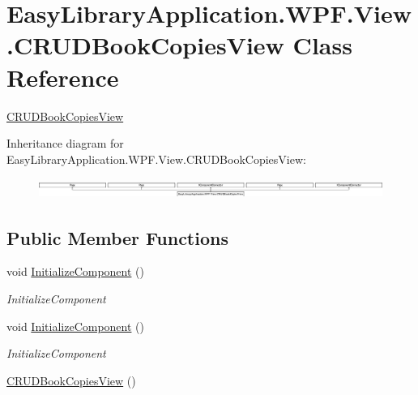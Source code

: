 \hypertarget{class_easy_library_application_1_1_w_p_f_1_1_view_1_1_c_r_u_d_book_copies_view}{}\section{Easy\+Library\+Application.\+W\+P\+F.\+View.\+C\+R\+U\+D\+Book\+Copies\+View Class Reference}
\label{class_easy_library_application_1_1_w_p_f_1_1_view_1_1_c_r_u_d_book_copies_view}


\mbox{\hyperlink{class_easy_library_application_1_1_w_p_f_1_1_view_1_1_c_r_u_d_book_copies_view}{C\+R\+U\+D\+Book\+Copies\+View}}  


Inheritance diagram for Easy\+Library\+Application.\+W\+P\+F.\+View.\+C\+R\+U\+D\+Book\+Copies\+View\+:\begin{figure}[H]
\begin{center}
\leavevmode
\includegraphics[height=0.643678cm]{class_easy_library_application_1_1_w_p_f_1_1_view_1_1_c_r_u_d_book_copies_view}
\end{center}
\end{figure}
\subsection*{Public Member Functions}
\begin{DoxyCompactItemize}
\item 
void \mbox{\hyperlink{class_easy_library_application_1_1_w_p_f_1_1_view_1_1_c_r_u_d_book_copies_view_aba4ee0c105f80387d4930984c400b7b0}{Initialize\+Component}} ()
\begin{DoxyCompactList}\small\item\em Initialize\+Component \end{DoxyCompactList}\item 
void \mbox{\hyperlink{class_easy_library_application_1_1_w_p_f_1_1_view_1_1_c_r_u_d_book_copies_view_aba4ee0c105f80387d4930984c400b7b0}{Initialize\+Component}} ()
\begin{DoxyCompactList}\small\item\em Initialize\+Component \end{DoxyCompactList}\item 
\mbox{\hyperlink{class_easy_library_application_1_1_w_p_f_1_1_view_1_1_c_r_u_d_book_copies_view_a6f46abaa81018dcba692e940bc35951d}{C\+R\+U\+D\+Book\+Copies\+View}} ()
\end{DoxyCompactItemize}


